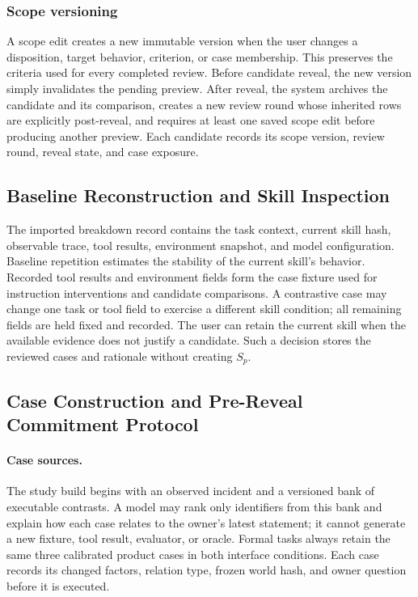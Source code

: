 \subsubsection{Scope versioning}
A scope edit creates a new immutable version when the user changes a disposition, target behavior, criterion, or case membership. This preserves the criteria used for every completed review. Before candidate reveal, the new version simply invalidates the pending preview. After reveal, the system archives the candidate and its comparison, creates a new review round whose inherited rows are explicitly post-reveal, and requires at least one saved scope edit before producing another preview. Each candidate records its scope version, review round, reveal state, and case exposure.

\subsection{Baseline Reconstruction and Skill Inspection}
\label{app:initial-inspection}

The imported breakdown record contains the task context, current skill hash, observable trace, tool results, environment snapshot, and model configuration. Baseline repetition estimates the stability of the current skill's behavior. Recorded tool results and environment fields form the case fixture used for instruction interventions and candidate comparisons. A contrastive case may change one task or tool field to exercise a different skill condition; all remaining fields are held fixed and recorded. The user can retain the current skill when the available evidence does not justify a candidate. Such a decision stores the reviewed cases and rationale without creating $S_p$.

\subsection{Case Construction and Pre-Reveal Commitment Protocol}
\label{app:case-protocol}

\paragraph{Case sources.}
The study build begins with an observed incident and a versioned bank of executable contrasts. A model may rank only identifiers from this bank and explain how each case relates to the owner's latest statement; it cannot generate a new fixture, tool result, evaluator, or oracle. Formal tasks always retain the same three calibrated product cases in both interface conditions. Each case records its changed factors, relation type, frozen world hash, and owner question before it is executed.

